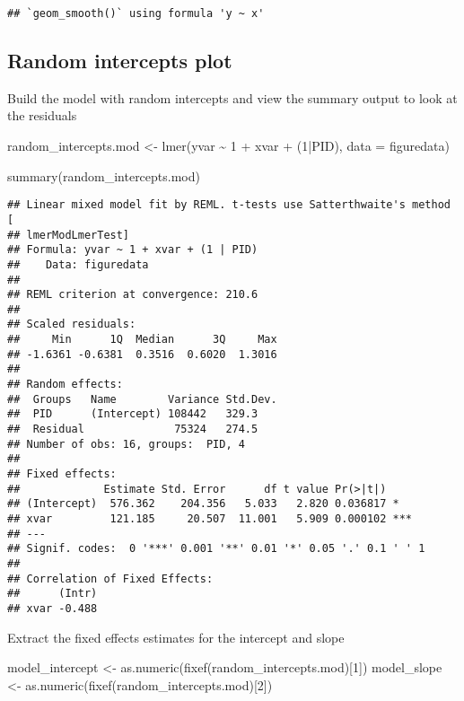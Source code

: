 \documentclass[
]{article}
\newenvironment{Shaded}{\begin{snugshade}}{\end{snugshade}}
\newcommand{\AttributeTok}[1]{\textcolor[rgb]{0.77,0.63,0.00}{#1}}
\newcommand{\DecValTok}[1]{\textcolor[rgb]{0.00,0.00,0.81}{#1}}
\newcommand{\FunctionTok}[1]{\textcolor[rgb]{0.00,0.00,0.00}{#1}}
\newcommand{\NormalTok}[1]{#1}
\newcommand{\OtherTok}[1]{\textcolor[rgb]{0.56,0.35,0.01}{#1}}
\newcommand{\SpecialCharTok}[1]{\textcolor[rgb]{0.00,0.00,0.00}{#1}}
\begin{document}
\begin{verbatim}
## `geom_smooth()` using formula 'y ~ x'
\end{verbatim}

\hypertarget{random-intercepts-plot}{%
\subsection{Random intercepts plot}\label{random-intercepts-plot}}

Build the model with random intercepts and view the summary output to
look at the residuals

\begin{Shaded}
\begin{Highlighting}[]
\NormalTok{random\_intercepts.mod }\OtherTok{\textless{}{-}} \FunctionTok{lmer}\NormalTok{(yvar }\SpecialCharTok{\textasciitilde{}} \DecValTok{1} \SpecialCharTok{+}\NormalTok{ xvar }\SpecialCharTok{+}\NormalTok{ (}\DecValTok{1}\SpecialCharTok{|}\NormalTok{PID), }\AttributeTok{data =}\NormalTok{ figuredata)}

\FunctionTok{summary}\NormalTok{(random\_intercepts.mod)}
\end{Highlighting}
\end{Shaded}

\begin{verbatim}
## Linear mixed model fit by REML. t-tests use Satterthwaite's method [
## lmerModLmerTest]
## Formula: yvar ~ 1 + xvar + (1 | PID)
##    Data: figuredata
## 
## REML criterion at convergence: 210.6
## 
## Scaled residuals: 
##     Min      1Q  Median      3Q     Max 
## -1.6361 -0.6381  0.3516  0.6020  1.3016 
## 
## Random effects:
##  Groups   Name        Variance Std.Dev.
##  PID      (Intercept) 108442   329.3   
##  Residual              75324   274.5   
## Number of obs: 16, groups:  PID, 4
## 
## Fixed effects:
##             Estimate Std. Error      df t value Pr(>|t|)    
## (Intercept)  576.362    204.356   5.033   2.820 0.036817 *  
## xvar         121.185     20.507  11.001   5.909 0.000102 ***
## ---
## Signif. codes:  0 '***' 0.001 '**' 0.01 '*' 0.05 '.' 0.1 ' ' 1
## 
## Correlation of Fixed Effects:
##      (Intr)
## xvar -0.488
\end{verbatim}

Extract the fixed effects estimates for the intercept and slope

\begin{Shaded}
\begin{Highlighting}[]
\NormalTok{model\_intercept }\OtherTok{\textless{}{-}} \FunctionTok{as.numeric}\NormalTok{(}\FunctionTok{fixef}\NormalTok{(random\_intercepts.mod)[}\DecValTok{1}\NormalTok{])}
\NormalTok{model\_slope }\OtherTok{\textless{}{-}} \FunctionTok{as.numeric}\NormalTok{(}\FunctionTok{fixef}\NormalTok{(random\_intercepts.mod)[}\DecValTok{2}\NormalTok{])}
\end{Highlighting}
\end{Shaded}
\end{document}
